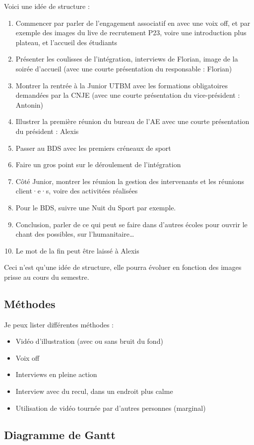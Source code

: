 Voici une idée de structure :
\begin{enumerate}
    \item Commencer par parler de l'engagement associatif en avec une voix off, et par exemple des images du live de recrutement P23, voire une introduction plus plateau, et l'accueil des étudiants
    \item Présenter les coulisses de l'intégration, interviews de Florian, image de la soirée d'accueil (avec une courte présentation du responsable : Florian)
    \item Montrer la rentrée à la Junior UTBM avec les formations obligatoires demandées par la \gls{CNJE} (avec une courte présentation du vice-président : Antonin)
    \item Illustrer la première réunion du bureau de l'AE avec une courte présentation du président : Alexis
    \item Passer au BDS avec les premiers créneaux de sport
    \item Faire un gros point sur le déroulement de l'intégration
    \item Côté Junior, montrer les réunion la gestion des intervenants et les réunions client·e·s, voire des activitées réalisées
    \item Pour le BDS, suivre une Nuit du Sport par exemple.
    \item Conclusion, parler de ce qui peut se faire dans d'autres écoles pour ouvrir le chant des possibles, sur l'humanitaire\ldots
    \item Le mot de la fin peut être laissé à Alexis
\end{enumerate}

Ceci n'est qu'une idée de structure, elle pourra évoluer en fonction des images prisse au cours du semestre.

\subsection{Méthodes}\label{subsec:methodes}

Je peux lister différentes méthodes :
\begin{itemize}
    \item Vidéo d'illustration (avec ou sans bruit du fond)
    \item Voix off
    \item Interviews en pleine action
    \item Interview avec du recul, dans un endroit plus calme
    \item Utilisation de vidéo tournée par d'autres personnes (marginal)
\end{itemize}

\subsection{Diagramme de Gantt}\label{subsec:diagramme-de-gantt}







